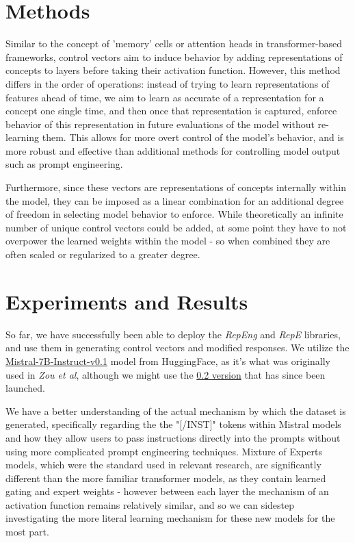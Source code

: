 \documentclass[11pt,a4paper]{article}
\begin{document}
\section{Methods}
Similar to the concept of 'memory' cells or attention heads in transformer-based frameworks, control vectors aim to induce behavior by adding representations of concepts to layers before taking their activation function. However, this method differs in the order of operations: instead of trying to learn representations of features ahead of time, we aim to learn as accurate of a representation for a concept one single time, and then once that representation is captured, enforce behavior of this representation in future evaluations of the model without re-learning them. This allows for more overt control of the model's behavior, and is more robust and effective than additional methods for controlling model output such as prompt engineering.

Furthermore, since these vectors are representations of concepts internally within the model, they can be imposed as a linear combination for an additional degree of freedom in selecting model behavior to enforce. While theoretically an infinite number of unique control vectors could be added, at some point they have to not overpower the learned weights within the model - so when combined they are often scaled or regularized to a greater degree.

\section{Experiments and Results}

So far, we have successfully been able to deploy the \emph{RepEng} and \emph{RepE} libraries, and use them in generating control vectors and modified responses. We utilize the \href{https://huggingface.co/mistralai/Mistral-7B-Instruct-v0.1}{Mistral-7B-Instruct-v0.1} model from HuggingFace, as it's what was originally used in \emph{Zou et al}\cite{zou2023representation}, although we might use the \href{https://huggingface.co/mistralai/Mistral-7B-Instruct-v0.2}{0.2 version} that has since been launched.

We have a better understanding of the actual mechanism by which the dataset is generated, specifically regarding the the "[/INST]" tokens within Mistral models and how they allow users to pass instructions directly into the prompts without using more complicated prompt engineering techniques. Mixture of Experts models, which were the standard used in relevant research, are significantly different than the more familiar transformer models, as they contain learned gating and expert weights - however between each layer the mechanism of an activation function remains relatively similar, and so we can sidestep investigating the more literal learning mechanism for these new models for the most part.
\end{document}
